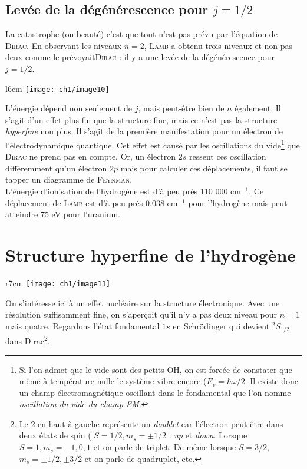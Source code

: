 \subsection{Levée de la dégénérescence pour $j=1/2$}
La catastrophe (ou beauté) c'est que tout n'est pas prévu par l'équation de \textsc{Dirac}. En 
observant les niveaux $n=2$, \textsc{Lamb} a obtenu trois niveaux et non pas deux comme le 
prévoyait\textsc{Dirac} : il y a une levée de la dégénérescence pour $j=1/2$.\\

	\begin{wrapfigure}[9]{l}{6cm}
	\vspace{-5mm}
	\texttt{[image: ch1/image10]}
	\end{wrapfigure}
L'énergie dépend non seulement de $j$, mais peut-être bien de $n$ également. Il s'agit d'un effet 
plus fin que la structure fine, mais ce n'est pas la structure \textit{hyperfine} non plus. Il 
s'agit de la première manifestation pour un électron de l'électrodynamique quantique. Cet effet
est causé par les oscillations du vide\footnote{Si l'on admet que le vide sont des petits OH, on 
est forcée de constater que même à température nulle le système vibre encore ($E_v = \hbar\omega/2$.
Il existe donc un champ électromagnétique oscillant dans le fondamental que l'on nomme 
\textit{oscillation du vide du champ EM}.} que \textsc{Dirac} ne prend pas en compte. Or, un 
électron $2s$ ressent ces oscillation différemment qu'un électron $2p$ mais pour calculer ces 
déplacements, il faut se tapper un diagramme de \textsc{Feynman}.\\

L'énergie d'ionisation de l'hydrogène est d'à peu près 110 000 cm$^{-1}$. Ce déplacement de 
\textsc{Lamb} est d'à peu près 0.038 cm$^{-1}$ pour l'hydrogène mais peut atteindre 75 eV pour 
l'uranium.


\section{Structure hyperfine de l'hydrogène}
	\begin{wrapfigure}[14]{r}{7cm}
	\vspace{-5mm}
	\texttt{[image: ch1/image11]}
	\end{wrapfigure}
On s'intéresse ici à un effet nucléaire sur la structure électronique. Avec une résolution 
suffisamment fine, on s'aperçoit qu'il n'y a pas deux niveau pour $n=1$ mais quatre. Regardons
l'état fondamental $1s$ en Schrödinger qui devient $^2S_{1/2}$ dans Dirac\footnote{Le 2 en haut à 
gauche représente un \textit{doublet} car l'électron peut être dans deux états de spin (
$S=1/2, m_s =\pm1/2$ : \textit{up} et \textit{down}. Lorsque $S=1, m_s=-1,0,1$ et on parle de triplet.
De même lorsque $S=3/2$, $m_s = \pm 1/2, \pm 3/2$ et on parle de quadruplet, etc. }. \\

